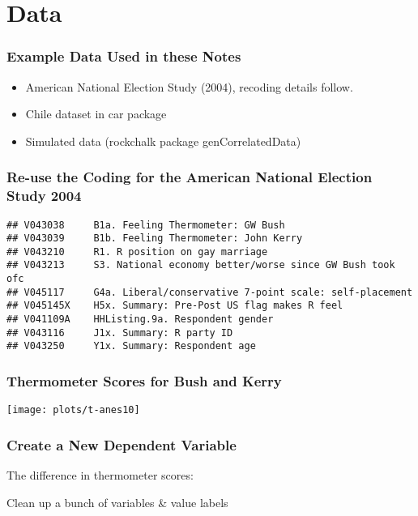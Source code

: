 \documentclass[10pt,english]{beamer}
\def\lyxframeend{} %
\begin{document}
\lyxframeend{}\section{Data}

\begin{frame}

\frametitle{Example Data Used in these Notes}
\begin{itemize}
\item American National Election Study (2004), recoding details follow.
\item Chile dataset in car package
\item Simulated data (rockchalk package genCorrelatedData)
\end{itemize}
\end{frame}

\begin{frame}
\frametitle{Re-use the Coding for the American National Election Study 2004}


\begin{lstlisting}[basicstyle={\footnotesize}]
## V043038     B1a. Feeling Thermometer: GW Bush
## V043039     B1b. Feeling Thermometer: John Kerry
## V043210     R1. R position on gay marriage
## V043213     S3. National economy better/worse since GW Bush took ofc
## V045117     G4a. Liberal/conservative 7-point scale: self-placement
## V045145X    H5x. Summary: Pre-Post US flag makes R feel
## V041109A    HHListing.9a. Respondent gender
## V043116     J1x. Summary: R party ID
## V043250     Y1x. Summary: Respondent age
\end{lstlisting}

\end{frame}

\begin{frame}[containsverbatim]
\frametitle{Thermometer Scores for Bush and Kerry}


\texttt{[image: plots/t-anes10]}

\end{frame}

\begin{frame}
\frametitle{Create a New Dependent Variable}


The difference in thermometer scores:




Clean up a bunch of variables \& value labels



\end{frame}
\end{document}
